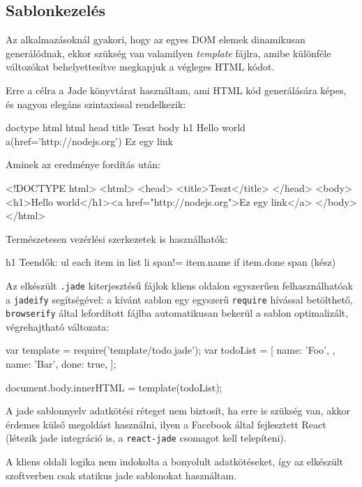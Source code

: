 \subsection{Sablonkezelés}

Az alkalmazásoknál gyakori, hogy az egyes DOM elemek dinamikusan generálódnak,
ekkor szükség van valamilyen \emph{template} fájlra, amibe különféle változókat
behelyettesítve megkapjuk a végleges HTML kódot.

Erre a célra a Jade könyvtárat\cite{Jade} használtam,
ami HTML kód generálására képes, és nagyon elegáns szintaxissal rendelkezik:

\begin{jade}
doctype html
html
  head
    title Teszt
  body
    h1 Hello world
    a(href='http://nodejs.org') Ez egy link
\end{jade}

Aminek az eredménye fordítás után:

\begin{html}
<!DOCTYPE html>
<html>
  <head>
    <title>Teszt</title>
  </head>
  <body>
    <h1>Hello world</h1><a href="http://nodejs.org">Ez egy link</a>
  </body>
</html>
\end{html}

Természetesen vezérlési szerkezetek is használhatók:

\begin{jade}
h1 Teendők:
ul
  each item in list
    li
      span!= item.name
      if item.done
        span (kész)
\end{jade}

Az elkészült \verb=.jade= kiterjesztésű fájlok kliens oldalon egyszerűen
felhasználhatóak a \verb=jadeify= segítségével: a kívánt sablon egy egyszerű
\verb=require= hívással betölthető, \verb=browserify= által lefordított
fájlba automatikusan bekerül a sablon optimalizált, végrehajtható változata:

\begin{js}
var template = require('template/todo.jade');
var todoList = [{
  name: 'Foo',
}, {
  name: 'Bar',
  done: true,
}];

document.body.innerHTML = template(todoList);
\end{js}

A jade sablonnyelv adatkötési réteget nem biztosít, ha erre is szükség van,
akkor érdemes külső megoldást használni, ilyen a Facebook által fejlesztett
React (létezik jade integráció is, a \verb=react-jade= csomagot
kell telepíteni).

A kliens oldali logika nem indokolta a bonyolult adatkötéseket, így az
elkészült szoftverben csak statikus jade sablonokat használtam.
